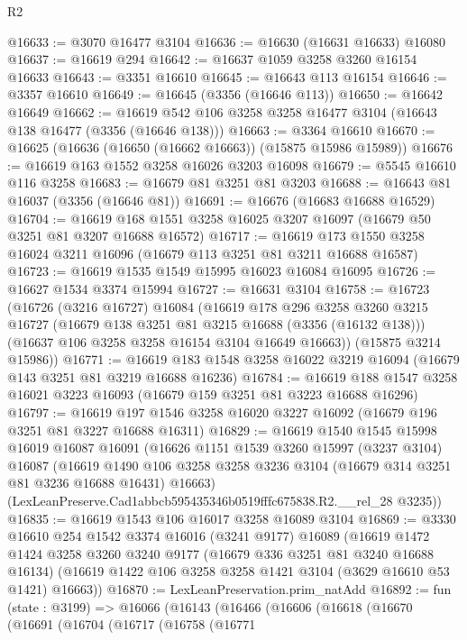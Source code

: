 \begin{lexlean}{R2}
\begin{coremodule}
@16633 := @3070 @16477 @3104
@16636 := @16630 (@16631 @16633) @16080
@16637 := @16619 @294
@16642 := @16637 @1059 @3258 @3260 @16154 @16633
@16643 := @3351 @16610
@16645 := @16643 @113 @16154
@16646 := @3357 @16610
@16649 := @16645 (@3356 (@16646 @113))
@16650 := @16642 @16649
@16662 := @16619 @542 @106 @3258 @3258 @16477 @3104 (@16643 @138 @16477 (@3356 (@16646 @138)))
@16663 := @3364 @16610
@16670 := @16625 (@16636 (@16650 (@16662 @16663)) (@15875 @15986 @15989))
@16676 := @16619 @163 @1552 @3258 @16026 @3203 @16098
@16679 := @5545 @16610 @116 @3258
@16683 := @16679 @81 @3251 @81 @3203
@16688 := @16643 @81 @16037 (@3356 (@16646 @81))
@16691 := @16676 (@16683 @16688 @16529)
@16704 := @16619 @168 @1551 @3258 @16025 @3207 @16097 (@16679 @50 @3251 @81 @3207 @16688 @16572)
@16717 := @16619 @173 @1550 @3258 @16024 @3211 @16096 (@16679 @113 @3251 @81 @3211 @16688 @16587)
@16723 := @16619 @1535 @1549 @15995 @16023 @16084 @16095
@16726 := @16627 @1534 @3374 @15994
@16727 := @16631 @3104
@16758 := @16723
    (@16726
      (@3216 @16727)
      @16084
      (@16619
        @178
        @296
        @3258
        @3260
        @3215
        @16727
        (@16679 @138 @3251 @81 @3215 @16688 (@3356 (@16132 @138)))
        (@16637 @106 @3258 @3258 @16154 @3104 @16649 @16663))
      (@15875 @3214 @15986))
@16771 := @16619 @183 @1548 @3258 @16022 @3219 @16094 (@16679 @143 @3251 @81 @3219 @16688 @16236)
@16784 := @16619 @188 @1547 @3258 @16021 @3223 @16093 (@16679 @159 @3251 @81 @3223 @16688 @16296)
@16797 := @16619 @197 @1546 @3258 @16020 @3227 @16092 (@16679 @196 @3251 @81 @3227 @16688 @16311)
@16829 := @16619
    @1540
    @1545
    @15998
    @16019
    @16087
    @16091
    (@16626
      @1151
      @1539
      @3260
      @15997
      (@3237 @3104)
      @16087
      (@16619 @1490 @106 @3258 @3258 @3236 @3104 (@16679 @314 @3251 @81 @3236 @16688 @16431) @16663)
      (LexLeanPreserve.Cad1abbcb595435346b0519fffc675838.R2.__rel_28 @3235))
@16835 := @16619 @1543 @106 @16017 @3258 @16089 @3104
@16869 := @3330
    @16610
    @254
    @1542
    @3374
    @16016
    (@3241 @9177)
    @16089
    (@16619
      @1472
      @1424
      @3258
      @3260
      @3240
      @9177
      (@16679 @336 @3251 @81 @3240 @16688 @16134)
      (@16619 @1422 @106 @3258 @3258 @1421 @3104 (@3629 @16610 @53 @1421) @16663))
@16870 := LexLeanPreservation.prim_natAdd
@16892 := fun (state : @3199) =>
  @16066
    (@16143
      (@16466
        (@16606
          (@16618
            (@16670
              (@16691
                (@16704
                  (@16717
                    (@16758
                      (@16771

\end{coremodule}
\end{lexlean}
